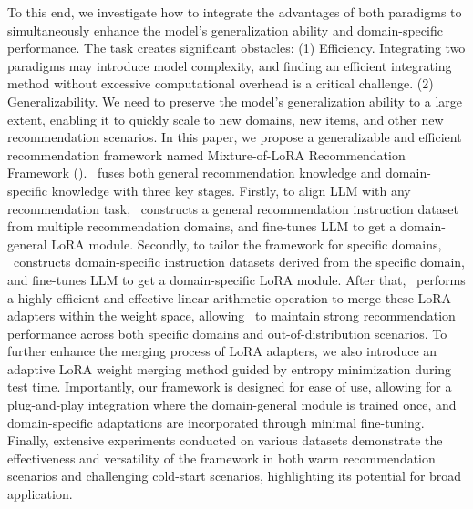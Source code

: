 To this end, we investigate how to integrate the advantages of both paradigms to simultaneously enhance the model's generalization ability and domain-specific performance. The task creates significant obstacles: (1) Efficiency. Integrating two paradigms may introduce model complexity, and finding an efficient integrating method without excessive computational overhead is a critical challenge. (2) Generalizability. We need to preserve the model's generalization ability to a large extent, enabling it to quickly scale to new domains, new items, and other new recommendation scenarios.
In this paper, we propose a generalizable and efficient recommendation framework named Mixture-of-LoRA Recommendation Framework (\shortname). 
\shortname~fuses both general recommendation knowledge and domain-specific knowledge with three key stages. Firstly, to align LLM with any recommendation task, \shortname~constructs a general recommendation instruction dataset from multiple recommendation domains, and fine-tunes LLM to get a domain-general LoRA module. Secondly, to tailor the framework for specific domains, \shortname~constructs domain-specific instruction datasets derived from the specific domain, and fine-tunes LLM to get a domain-specific LoRA module. After that, \shortname~performs a highly efficient and effective linear arithmetic operation to merge these LoRA adapters within the weight space, allowing \shortname~to maintain strong recommendation performance across both specific domains and out-of-distribution scenarios. To further enhance the merging process of LoRA adapters, we also introduce an adaptive LoRA weight merging method guided by entropy minimization during test time.  Importantly, our framework is designed for ease of use, allowing for a plug-and-play integration where the domain-general module is trained once, and domain-specific adaptations are incorporated through minimal fine-tuning.  Finally, extensive experiments conducted on various datasets demonstrate the effectiveness and versatility of the framework in both warm recommendation scenarios and challenging cold-start scenarios, highlighting its potential for broad application.











\iffalse
Unlike traditional deep learning models, which are typically designed for specific tasks and datasets, LLMs possess rich internal knowledge, enabling superior generalization to novel tasks. This makes them particularly effective in addressing challenges faced by conventional models. As a result, there has been growing interest in exploring the potential of adapting LLMs for recommendation tasks, namely LLM-based recommendation~\cite{10.1145/3678004,wu2024survey}.
\fi

